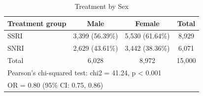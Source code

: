 \documentclass{article}
\begin{document}
\begin{table}[htbp]
\centering
\captionsetup{justification=raggedright,singlelinecheck=false}
\caption{Treatment by Sex}
\label{tab:demo_latex_report-3}
\begin{tabular}{lccc}
\toprule
Treatment group & Male & Female & Total \\
\midrule
SSRI & 3,399 (56.39\%) & 5,530 (61.64\%) & 8,929 \\
SNRI & 2,629 (43.61\%) & 3,442 (38.36\%) & 6,071 \\
Total & 6,028 & 8,972 & 15,000 \\
\multicolumn{4}{l}{Pearson's chi-squared test: chi2 = 41.24, p \textless{} 0.001} \\
\multicolumn{4}{l}{OR = 0.80 (95\% CI: 0.75, 0.86)} \\
\bottomrule
\end{tabular}
\end{table}
\end{document}
